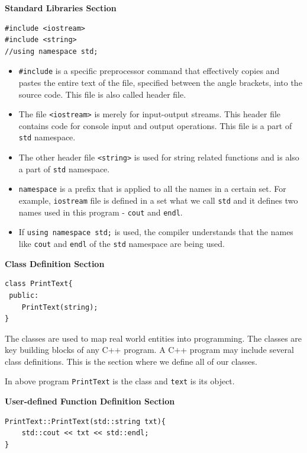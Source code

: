 \documentclass[main]{subfiles}
\begin{document}
\textbf{Standard Libraries Section}
\begin{verbatim}
#include <iostream>
#include <string>
//using namespace std;
\end{verbatim}
\begin{itemize}
    \item\texttt{\#include} is a specific preprocessor command that effectively copies and pastes the entire text of the file, specified between the angle brackets, into the source code. This file is also called header file.
    
    \item The file \texttt{<iostream>} is merely for input-output streams. This header file contains code for console input and output operations. This file is a part of \texttt{std} namespace.
    
    \item The other header file \texttt{<string>} is used for string related functions and is also a part of \texttt{std} namespace.
    
    \item \texttt{namespace} is a prefix that is applied to all the names in a certain set. For example, \texttt{iostream} file is defined in a set what we call \texttt{std}
    and it defines two names used in this program - \texttt{cout} and \texttt{endl}.
    
    \item If \texttt{using namespace std;} is used, the compiler understands that the names like \texttt{cout} and \texttt{endl} of the \texttt{std} namespace are being used.
    
\end{itemize}

\textbf{Class Definition Section}
\begin{verbatim}
class PrintText{
 public:
    PrintText(string);
}
\end{verbatim}
The classes are used to map real world entities into programming. The classes are key building blocks of any C++ program. A C++ program may include several class definitions. This is the section where we define all of our classes.

In above program \texttt{PrintText} is the class and \texttt{text} is its object.

\textbf{User-defined Function Definition Section}
\begin{verbatim}
PrintText::PrintText(std::string txt){
    std::cout << txt << std::endl;
}
\end{verbatim}
\end{document}
